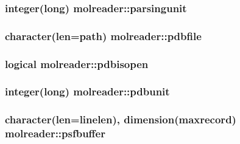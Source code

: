 \hypertarget{classmolreader_ac41219b2f68591f315dded4488483263}{
\subsubsection[{parsingunit}]{\setlength{\rightskip}{0pt plus 5cm}integer(long) molreader\-::parsingunit\hspace{0.3cm}{\ttfamily [private]}}}\label{classmolreader_ac41219b2f68591f315dded4488483263}
\hypertarget{classmolreader_aa372f060e4e581b1c14e2b46a65d2df4}{
\subsubsection[{pdbfile}]{\setlength{\rightskip}{0pt plus 5cm}character(len=path) molreader\-::pdbfile\hspace{0.3cm}{\ttfamily [private]}}}\label{classmolreader_aa372f060e4e581b1c14e2b46a65d2df4}
\hypertarget{classmolreader_ad7636360c8e0ecb526000567dd32d2d0}{
\subsubsection[{pdbisopen}]{\setlength{\rightskip}{0pt plus 5cm}logical molreader\-::pdbisopen\hspace{0.3cm}{\ttfamily [private]}}}\label{classmolreader_ad7636360c8e0ecb526000567dd32d2d0}
\hypertarget{classmolreader_a5b0570862e5318937ea68a01966ed56f}{
\subsubsection[{pdbunit}]{\setlength{\rightskip}{0pt plus 5cm}integer(long) molreader\-::pdbunit\hspace{0.3cm}{\ttfamily [private]}}}\label{classmolreader_a5b0570862e5318937ea68a01966ed56f}
\hypertarget{classmolreader_aab845daa54f6803a37ceb91d7ad296a7}{
\subsubsection[{psfbuffer}]{\setlength{\rightskip}{0pt plus 5cm}character(len={\bf linelen}), dimension({\bf maxrecord}) molreader\-::psfbuffer\hspace{0.3cm}{\ttfamily [private]}}}\label{classmolreader_aab845daa54f6803a37ceb91d7ad296a7}
